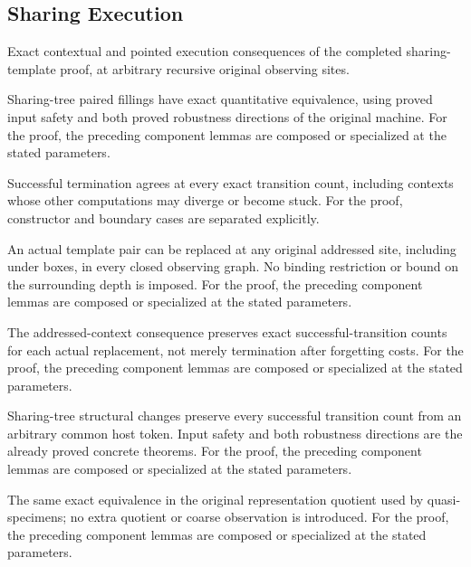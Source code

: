 \subsection{Sharing Execution}
Exact contextual and pointed execution consequences of the completed sharing-template proof, at arbitrary recursive original observing sites.

Sharing-tree paired fillings have exact quantitative equivalence, using proved input safety and both proved robustness directions of the original machine.
For the proof, the preceding component lemmas are composed or specialized at the stated parameters.
\par{}

Successful termination agrees at every exact transition count, including contexts whose other computations may diverge or become stuck.
For the proof, constructor and boundary cases are separated explicitly.
\par{}

An actual template pair can be replaced at any original addressed site, including under boxes, in every closed observing graph. No binding restriction or bound on the surrounding depth is imposed.
For the proof, the preceding component lemmas are composed or specialized at the stated parameters.
\par{}

The addressed-context consequence preserves exact successful-transition counts for each actual replacement, not merely termination after forgetting costs.
For the proof, the preceding component lemmas are composed or specialized at the stated parameters.
\par{}

Sharing-tree structural changes preserve every successful transition count from an arbitrary common host token. Input safety and both robustness directions are the already proved concrete theorems.
For the proof, the preceding component lemmas are composed or specialized at the stated parameters.
\par{}

The same exact equivalence in the original representation quotient used by quasi-specimens; no extra quotient or coarse observation is introduced.
For the proof, the preceding component lemmas are composed or specialized at the stated parameters.
\par{}


